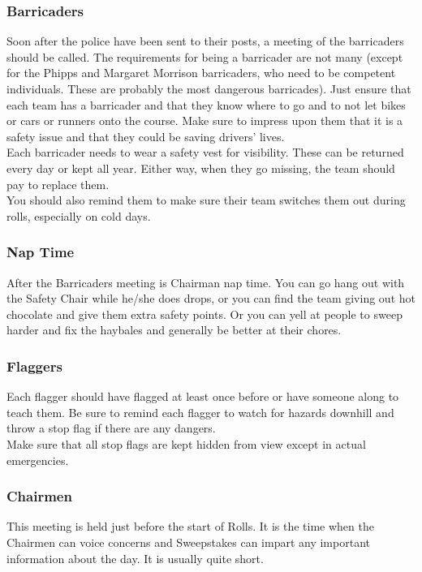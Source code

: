 \subsubsection{Barricaders}
Soon after the police have been sent to their posts, a meeting of the
barricaders should be called. The requirements for being a barricader are not
many (except for the Phipps and Margaret Morrison barricaders, who need to be
competent individuals. These are probably the most dangerous barricades).
Just ensure that each team has a barricader and that they know where to go
and to not let bikes or cars or runners onto the course. Make sure to impress
upon them that it is a safety issue and that they could be saving drivers'
lives.
\\
Each barricader needs to wear a safety vest for visibility. These can be
returned every day or kept all year. Either way, when they go missing,
the team should pay to replace them.
\\
You should also remind them to make sure their team switches them out
during rolls, especially on cold days.

\subsubsection{Nap Time}
After the Barricaders meeting is Chairman nap time. You can go hang out
with the Safety Chair while he/she does drops, or you can find the team
giving out hot chocolate and give them extra safety points. Or you can yell
at people to sweep harder and fix the haybales and generally be better at
their chores.

\subsubsection{Flaggers}
Each flagger should have flagged at least once before or have someone along
to teach them. Be sure to remind each flagger to watch for hazards downhill
and throw a stop flag if there are any dangers.
\\
Make sure that all stop flags are kept hidden from view except in actual
emergencies.

\subsubsection{Chairmen}
This meeting is held just before the start of Rolls. It is the time when
the Chairmen can voice concerns and Sweepstakes can impart any important
information about the day. It is usually quite short.

